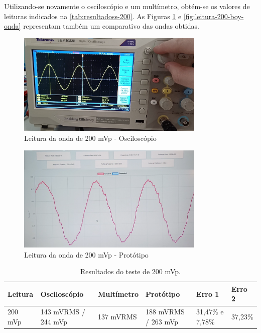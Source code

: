 Utilizando-se novamente o osciloscópio e um multímetro, obtém-se os valores de leituras indicados na \autoref{tab:resultadoss-200}. As Figuras \ref{fig:leitura-200-osc} e \autoref{fig:leitura-200-boy-onda} representam também um comparativo das ondas obtidas.

\begin{figure}[htb!]
    \caption{Leitura da onda de 200 mVp - Osciloscópio}
    \label{fig:leitura-200-osc}
    \includegraphics[width=0.8\textwidth]{figuras/leitura-200-osc.png}
    \fonte{}
\end{figure}

\begin{figure}[htb!]
    \caption{Leitura da onda de 200 mVp - Protótipo}
    \label{fig:leitura-200-boy-onda}
    \includegraphics[width=0.8\textwidth]{figuras/leitura-200-boy-onda.png}
    \fonte{}
\end{figure}

\begin{table}[!ht]
    \centering
    \caption{Resultados do teste de 200 mVp.}
    \label{tab:resultadoss-200}
    \begin{tabular}{ p{2cm} p{3cm} p{2cm} p{2cm} p{2cm} p{2cm} }
        \hline
        \textbf{Leitura} & \textbf{Osciloscópio} & \textbf{Multímetro} & \textbf{Protótipo}    & \textbf{Erro 1}  & \textbf{Erro 2}   \\ \hline
        200 mVp          & 143 mVRMS / 244 mVp   & 137 mVRMS           & 188 mVRMS / 263 mVp   & 31,47\% e 7,78\% & 37,23\%           \\ \hline
    \end{tabular}
    \fonte{}
\end{table}


